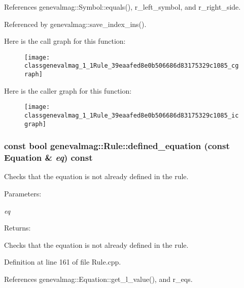 References genevalmag::Symbol::equals(), r\_\-left\_\-symbol, and r\_\-right\_\-side.

Referenced by genevalmag::save\_\-index\_\-ins().

Here is the call graph for this function:\nopagebreak
\begin{figure}[H]
\begin{center}
\leavevmode
\texttt{[image: classgenevalmag\_1\_1Rule\_39eaafed8e0b506686d83175329c1085\_cgraph]}
\end{center}
\end{figure}


Here is the caller graph for this function:\nopagebreak
\begin{figure}[H]
\begin{center}
\leavevmode
\texttt{[image: classgenevalmag\_1\_1Rule\_39eaafed8e0b506686d83175329c1085\_icgraph]}
\end{center}
\end{figure}
\hypertarget{classgenevalmag_1_1Rule_17ed3eece9dc6599966b4d97a249af5a}{
\subsubsection[{defined\_\-equation}]{\setlength{\rightskip}{0pt plus 5cm}const bool genevalmag::Rule::defined\_\-equation (const {\bf Equation} \& {\em eq}) const}}
\label{classgenevalmag_1_1Rule_17ed3eece9dc6599966b4d97a249af5a}


Checks that the equation is not already defined in the rule. \begin{Desc}
\item[Parameters:]
\begin{description}
\item[{\em eq}]\end{description}
\end{Desc}
\begin{Desc}
\item[Returns:]\end{Desc}
Checks that the equation is not already defined in the rule. 

Definition at line 161 of file Rule.cpp.

References genevalmag::Equation::get\_\-l\_\-value(), and r\_\-eqs.

